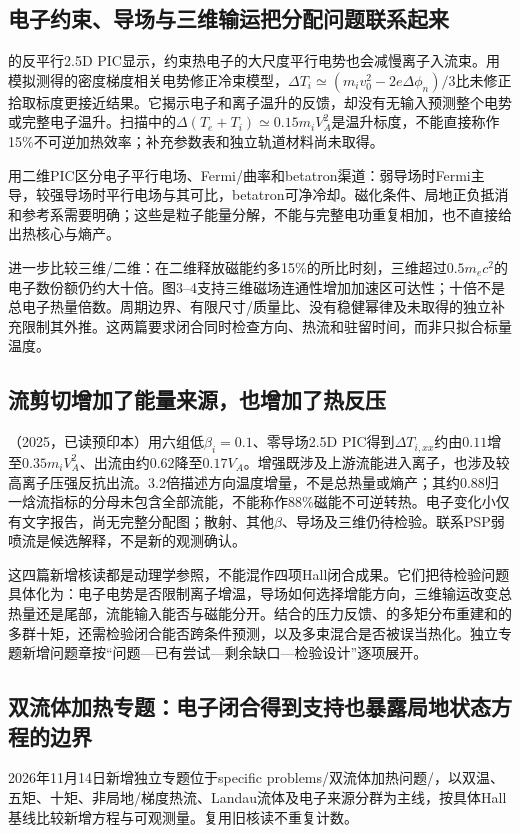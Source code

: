 \documentclass[UTF8,a4paper,11pt,openany,fontset=fandol]{ctexbook}
\begin{document}
\subsection{电子约束、导场与三维输运把分配问题联系起来}
\citet{Haggerty2015Partition}的反平行2.5D PIC显示，约束热电子的大尺度平行电势也会减慢离子入流束。用模拟测得的密度梯度相关电势修正冷束模型，$\Delta T_i\simeq(m_iv_0^2-2e\Delta\phi_n)/3$比未修正拾取标度更接近结果。它揭示电子和离子温升的反馈，却没有无输入预测整个电势或完整电子温升。扫描中的$\Delta(T_e+T_i)\simeq0.15m_iV_A^2$是温升标度，不能直接称作15\%不可逆加热效率；补充参数表和独立轨道材料尚未取得。

\citet{Dahlin2014Mechanisms}用二维PIC区分电子平行电场、Fermi/曲率和betatron渠道：弱导场时Fermi主导，较强导场时平行电场与其可比，betatron可净冷却。磁化条件、局地正负抵消和参考系需要明确；这些是粒子能量分解，不能与完整电功重复相加，也不直接给出热核心与熵产。

\citet{Dahlin2015ThreeD}进一步比较三维/二维：在二维释放磁能约多15\%的所比时刻，三维超过$0.5m_ec^2$的电子数份额仍约大十倍。图3--4支持三维磁场连通性增加加速区可达性；十倍不是总电子热量倍数。周期边界、有限尺寸/质量比、没有稳健幂律及未取得的独立补充限制其外推。这两篇要求闭合同时检查方向、热流和驻留时间，而非只拟合标量温度。

\subsection{流剪切增加了能量来源，也增加了热反压}
\citet{F627}（2025，已读预印本）用六组低$\beta_i=0.1$、零导场2.5D PIC得到$\Delta T_{i,xx}$约由$0.11$增至$0.35m_iV_A^2$、出流由约$0.62$降至$0.17V_A$。增强既涉及上游流能进入离子，也涉及较高离子压强反抗出流。3.2倍描述方向温度增量，不是总热量或熵产；其约0.88归一焓流指标的分母未包含全部流能，不能称作88\%磁能不可逆转热。电子变化小仅有文字报告，尚无完整分配图；散射、其他$\beta$、导场及三维仍待检验。联系PSP弱喷流是候选解释，不是新的观测确认。

这四篇新增核读都是动理学参照，不能混作四项Hall闭合成果。它们把待检验问题具体化为：电子电势是否限制离子增温，导场如何选择增能方向，三维输运改变总热量还是尾部，流能输入能否与磁能分开。结合\citet{F611}的压力反馈、\citet{E553}的多矩分布重建和\citet{F635}的多群十矩，还需检验闭合能否跨条件预测，以及多束混合是否被误当热化。独立专题新增问题章按“问题—已有尝试—剩余缺口—检验设计”逐项展开。

\subsection{双流体加热专题：电子闭合得到支持也暴露局地状态方程的边界}
2026年11月14日新增独立专题位于\textsf{specific problems/双流体加热问题/}，以双温、五矩、十矩、非局地/梯度热流、Landau流体及电子来源分群为主线，按具体Hall基线比较新增方程与可观测量。复用旧核读不重复计数。
\end{document}

